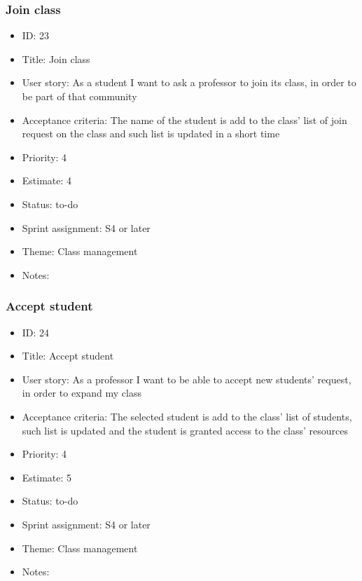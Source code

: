 \subsubsection{Join class}
\begin{itemize}
	\item ID: 23 
	\item Title: Join class
	\item User story: As a student I want to ask a professor to join its class, in order to be part of that community
	\item Acceptance criteria: The name of the student is add to the class' list of join request on the class and such list is updated in a short time
	\item Priority: 4
	\item Estimate: 4
	\item Status: to-do
	\item Sprint assignment: S4 or later
	\item Theme: Class management
	\item Notes:
\end{itemize}

\subsubsection{Accept student}
\begin{itemize}
	\item ID: 24
	\item Title: Accept student
	\item User story: As a professor I want to be able to accept new students' request, in order to expand my class
	\item Acceptance criteria: The selected student is add to the class' list of students, such list is updated and the student is granted access to the class' resources
	\item Priority: 4
	\item Estimate: 5
	\item Status: to-do
	\item Sprint assignment: S4 or later
	\item Theme: Class management
	\item Notes:
\end{itemize}

